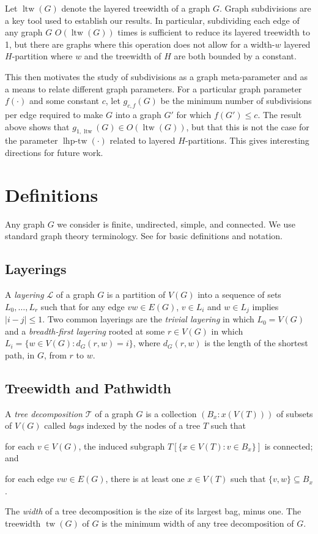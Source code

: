 \documentclass[kpfonts]{patmorin}
\DeclareMathOperator{\tw}{tw}
\DeclareMathOperator{\ltw}{ltw}
\DeclareMathOperator{\lhptw}{lhp-tw}
\begin{document}
Let $\ltw(G)$ denote the layered treewidth of a graph $G$. Graph subdivisions are a key tool used to establish our results.  In particular, subdividing each edge of any graph $G$ $O(\ltw(G))$ times is sufficient to reduce its layered treewidth to 1, but there are graphs where this operation does not allow for a width-$w$ layered $H$-partition where $w$ and the treewidth of $H$ are both bounded by a constant.

This then motivates the study of subdivisions as a graph meta-parameter and as a means to relate different graph parameters.  For a particular graph parameter $f(\cdot)$ and some constant $c$, let $g_{c,f}(G)$ be the minimum number of subdivisions per edge required to make $G$ into a graph $G'$ for which $f(G')\le c$.  The result above shows that $g_{1,\ltw}(G)\in O(\ltw(G))$, but that this is not the case for the parameter $\lhptw(\cdot)$ related to layered $H$-partitions.  This gives interesting directions for future work.


\section{Definitions}

Any graph $G$ we consider is finite, undirected, simple, and connected.  We use standard graph theory terminology. See \citet{diestel:graph} for basic definitions and notation.

\subsection{Layerings}

A \emph{layering} $\mathcal{L}$ of a graph $G$ is a partition of $V(G)$ into a sequence of sets $L_0,\ldots,L_r$ such that for any edge $vw\in E(G)$, $v\in L_i$ and $w\in L_j$ implies $|i-j|\le 1$.  Two common layerings are the \emph{trivial layering} in which $L_0=V(G)$ and a \emph{breadth-first layering} rooted at some $r\in V(G)$ in which $L_i=\{w\in V(G): d_G(r,w)=i\}$, where $d_G(r,w)$ is the length of the shortest path, in $G$, from $r$ to $w$.

\subsection{Treewidth and Pathwidth}
A \emph{tree decomposition} $\mathcal{T}$ of a graph $G$ is a collection $(B_x:x(V(T)))$ of subsets of $V(G)$ called \emph{bags} indexed by the nodes of a tree $T$ such that
\begin{inparaenum}[(i)]
    \item for each $v\in V(G)$, the induced subgraph $T[\{x\in V(T):v\in B_x\}]$ is connected; and
    \item for each edge $vw\in E(G)$, there is at least one $x\in V(T)$ such that $\{v,w\}\subseteq B_x$.
\end{inparaenum}
The \emph{width} of a tree decomposition is the size of its largest bag, minus one.  The treewidth $\tw(G)$ of $G$ is the minimum width of any tree decomposition of $G$.
\end{document}
